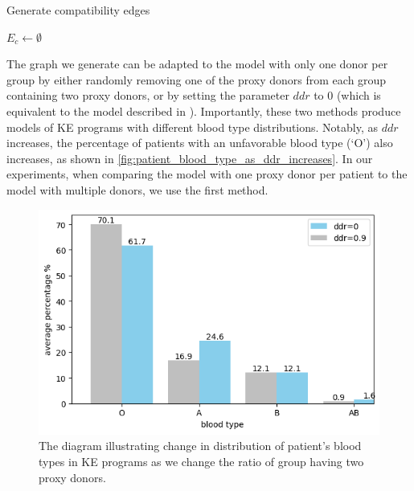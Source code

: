 \begin{algorithm}
    \caption{Generate compatibility edges}
    \label{alg:generate_compatibility_edges}


    $E_c \gets \emptyset$\;

\end{algorithm}

The graph we generate can be adapted to the model with only one donor per group by either randomly removing one of the proxy donors from each group containing two proxy donors, or by setting the parameter $ddr$ to $0$ (which is equivalent to the model described in \cite{toulis2011random}). Importantly, these two methods produce models of \ac{KE} programs with different blood type distributions. Notably, as $ddr$ increases, the percentage of patients with an unfavorable blood type (‘O’) also increases, as shown in \autoref{fig:patient_blood_type_as_ddr_increases}. In our experiments, when comparing the model with one proxy donor per patient to the model with multiple donors, we use the first method.

\begin{figure}[H]
    \centering
    \includegraphics[width=1.\linewidth]{data/patient_blood_type_as_ddr_increases.png}
    \caption[Distribution of patient's blood types as double donor ratio changes]{The diagram illustrating change in distribution of patient's blood types in \ac{KE} programs as we change the ratio of group having two proxy donors.}
    \label{fig:patient_blood_type_as_ddr_increases}
\end{figure}



